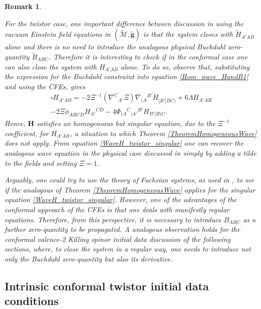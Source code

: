\documentclass[10pt,a4paper]{article}
\theoremstyle{plain}
\newtheorem{remark}{Remark}
\def\bmg{{\bm g}}
\def\bmH{{\bm H}}
\begin{document}
\begin{remark}
\em{
For the twistor case, one important difference between discussion in
\cite{GasVal15}
using the vacuum Einstein field equations in  $(\tilde{\mathcal{M}},\tilde{\bmg})$
is that the system closes with $\tilde{H}_{A'AB}$ alone and there is no need
to introduce the analogous physical Buchdahl zero-quantity $\tilde{B}_{ABC}$.
Therefore it is interesting to check if in the conformal case
one can also close the system with $H_{A'AB}$ alone.
To do so, observe that, substituting the expression for
the Buchdahl constraint into equation
\eqref{Hom_wave_HandB1} and using the CFEs, gives
\begin{multline}\label{WaveH_twistor_singular}
  \square H_{A'AB} =  - 2\Xi^{-1} (\nabla^{C}{}_{A'}\Xi)
    \nabla_{(A}{}^{B'}H_{|B'|BC)}+ 6 \Lambda H_{A'AB} \\-2 \Xi
  \phi _{ABCD}H_{A'}{}^{CD} -4
  \Phi_{(A}{}^{C}{}_{|A'}{}^{B'}H_{B'|B)C}.
\end{multline}
Hence, $\bmH$ satisfies  an homogeneous but
\emph{singular equation}, due to the $\Xi^{-1}$ coefficient,
for $H_{A'AB}$, a situation to which Theorem
\ref{TheoremHomogeneousWave} does not apply.
From equation \eqref{WaveH_twistor_singular} one can
recover the analogous wave equation in the physical case
discussed in \cite{GasVal15} simply by adding a tilde to the fields and
setting $\Xi=1$.

Arguably, one could try
to use the theory of \textit{Fuchsian systems}, as used in \cite{ChrPaetz13,Pae14a}, to see if the analogous of
Theorem \ref{TheoremHomogeneousWave} applies for the singular equation
\eqref{WaveH_twistor_singular}.  However, one of the advantages of the
conformal approach of the CFEs is that one deals with manifestly regular equations.
Therefore, from this perspective, it is necessary to introduce $B_{ABC}$ as a further zero-quantity to
be propagated.  A analogous observation holds for the conformal valence-2
Killing spinor initial data discussion of the following sections,
where, to close the system in a regular way, one needs to introduce not
only the Buchdahl zero-quantity but also its derivative.}
\end{remark}


\subsection{Intrinsic conformal twistor initial data conditions}
\end{document}
